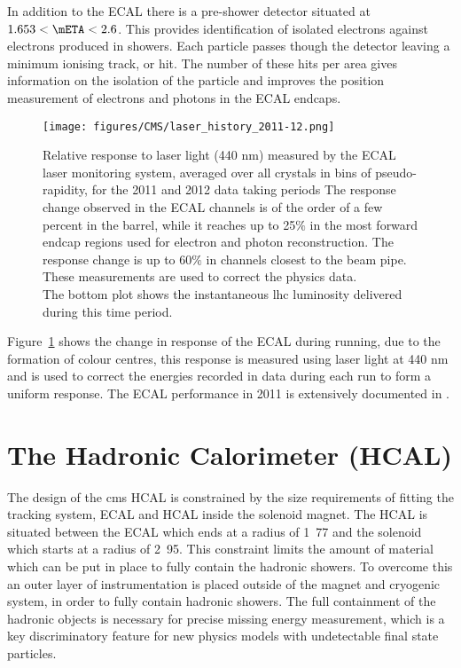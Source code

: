 In addition to the ECAL there is a pre-shower detector situated at $1.653 <
\mETA < 2.6$. This provides identification of isolated electrons against
electrons produced in showers. Each particle passes though the detector leaving
a minimum ionising track, or hit. The number of these hits per area gives
information on the isolation of the particle and improves the position
measurement of electrons and photons in the ECAL endcaps.
\begin{figure}[ht]
  \centering
    \texttt{[image: figures/CMS/laser\_history\_2011-12.png]}
  \caption{Relative response to laser light (440 nm) measured by the ECAL laser
monitoring system, averaged over all crystals in bins of pseudo-rapidity, for
the 2011 and 2012 data taking periods
The response change observed in the ECAL channels is of the order of a few
percent in the barrel, while it reaches up to 25$\%$ in the most forward endcap
regions used for electron and photon reconstruction. The response change is up
to 60$\%$ in channels closest to the beam pipe. These measurements are used to
correct the physics data. \\ The bottom plot shows the instantaneous \ac{lhc}
luminosity delivered during this time period.}
  \label{fig:figures_CMS_laser_history_2011-12}
\end{figure}

Figure~\ref{fig:figures_CMS_laser_history_2011-12} shows the change in response
of the ECAL during running, due to the formation of colour centres, this
response is measured using laser light at 440 nm and is used to correct the
energies recorded in data during each run to form a uniform response.
The ECAL performance in 2011 is extensively documented in .

\section{The Hadronic Calorimeter (HCAL)} %
\label{sec:the_hadronic_calorimeter}
The design of the \ac{cms} HCAL is constrained by the size requirements of
fitting the tracking system, ECAL and HCAL inside the solenoid magnet. The HCAL
is situated between the ECAL which ends at a radius of \unit{1.77}{\meter} and
the solenoid which starts at a radius of \unit{2.95}{\meter}. This constraint
limits the amount of material which can be put in place to fully contain the
hadronic showers. To overcome this an outer layer of instrumentation is placed
outside of the magnet and cryogenic system, in order to fully contain hadronic 
showers. The full containment of the hadronic objects is necessary for precise 
missing energy measurement, which is a key discriminatory feature for new 
physics models with undetectable final state particles.

